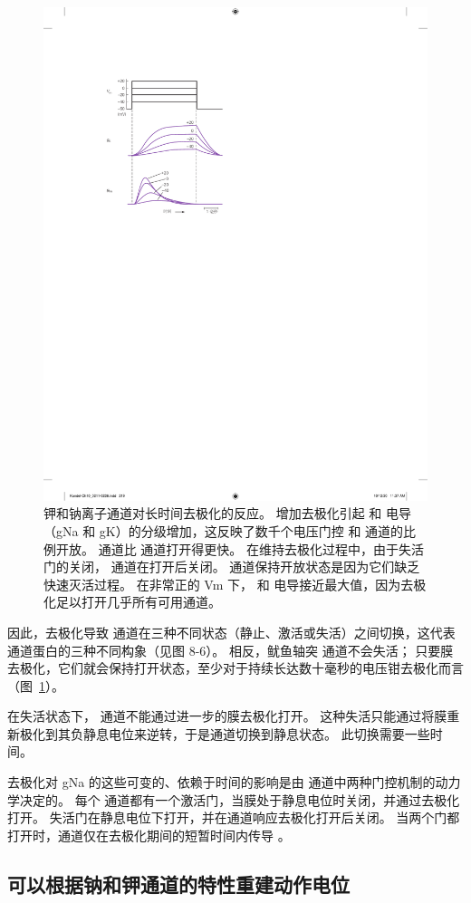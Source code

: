 \begin{figure}[htbp]
	\centering
	\includegraphics[width=0.5\linewidth]{chap10/fig_10_6}
	\caption{钾和钠离子通道对长时间去极化的反应。 增加去极化引起  和  电导（gNa 和 gK）的分级增加，这反映了数千个电压门控  和  通道的比例开放。  通道比  通道打开得更快。 在维持去极化过程中，由于失活门的关闭， 通道在打开后关闭。  通道保持开放状态是因为它们缺乏快速灭活过程。 在非常正的 Vm 下， 和  电导接近最大值，因为去极化足以打开几乎所有可用通道。}
	\label{fig:10_6}
\end{figure}


因此，去极化导致  通道在三种不同状态（静止、激活或失活）之间切换，这代表  通道蛋白的三种不同构象（见图 8-6）。
相反，鱿鱼轴突  通道不会失活；
只要膜去极化，它们就会保持打开状态，至少对于持续长达数十毫秒的电压钳去极化而言（图~\ref{fig:10_6}）。


在失活状态下， 通道不能通过进一步的膜去极化打开。
这种失活只能通过将膜重新极化到其负静息电位来逆转，于是通道切换到静息状态。
此切换需要一些时间。


去极化对 gNa 的这些可变的、依赖于时间的影响是由  通道中两种门控机制的动力学决定的。
每个  通道都有一个激活门，当膜处于静息电位时关闭，并通过去极化打开。
失活门在静息电位下打开，并在通道响应去极化打开后关闭。
当两个门都打开时，通道仅在去极化期间的短暂时间内传导 。



\subsection{可以根据钠和钾通道的特性重建动作电位}

